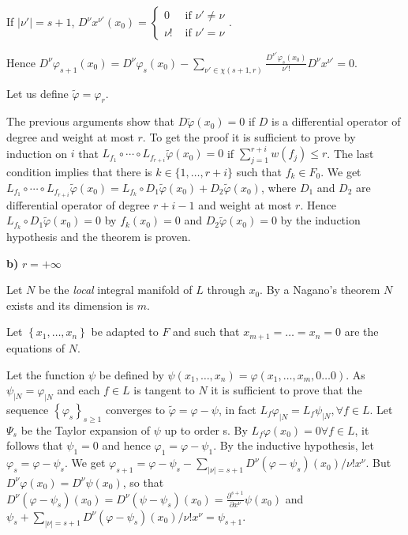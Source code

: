 \documentclass{article}
\begin{document}
If $\left|\nu'\right|=s+1$, $D^\nu x^{\nu'}\left(x_0\right)=\begin{cases}0 & \text { if } \nu' \neq \nu \\ \nu! & \text { if } \nu'=\nu\end{cases}$.

Hence $D^\nu \varphi_{s+1}\left(x_0\right)=D^\nu \varphi_s\left(x_0\right)-\sum_{\nu' \in \chi(s+1, r)} \frac{D^{\nu'} \varphi_s\left(x_0\right)}{\nu'!} D^\nu x^{\nu'}=0$.

Let us define $\tilde{\varphi}=\varphi_r$.

The previous arguments show that $D \tilde{\varphi}\left(x_0\right)=0$ if $D$ is a differential operator of degree and weight at most $r$. 
To get the proof it is sufficient to prove by induction on $i$ that $L_{f_1} \circ \cdots \circ L_{f_{r+i}} \tilde{\varphi}\left(x_0\right)=0$ if $\sum_{j=1}^{r+i} w\left(f_j\right) \leq r$. 
The last condition implies that there is $k \in \{ 1, \ldots, r+i \}$ such that $f_k \in F_0$. 
We get
$L_{f_1} \circ \cdots \circ L_{f_{r+i}} \tilde{\varphi}\left(x_0\right)=L_{f_k} \circ D_1 \tilde{\varphi}\left(x_0\right)+D_2 \tilde{\varphi}\left(x_0\right)$, where $D_1$ and $D_2$ are differential operator of degree $r+i-1$ and weight at most $r$. Hence $L_{f_k} \circ D_1 \tilde{\varphi}\left(x_0\right)=0$ by $f_k\left(x_0\right)=0$ and $D_2 \tilde{\varphi}\left(x_0\right)=0$ by the induction hypothesis and the theorem is proven.

\bigskip
\textbf{b)} \underline{$r=+\infty$}

Let $N$ be the \emph{local} integral manifold of $L$ through $x_0$. By a Nagano's theorem $N$ exists and its dimension is $m$.

Let $\left\{x_1, \ldots, x_n\right\}$ be adapted to $F$ and such that $x_{m+1}=\ldots=x_n=0$ are the equations of $N$.

Let the function $\psi$ be defined by $\psi\left(x_1, \ldots, x_n\right)=\varphi\left(x_1, \ldots, x_m, 0 \ldots 0\right)$.
As $\psi_{\mid N}=\varphi_{\mid N}$ and each $f \in L$ is tangent to $N$ it is sufficient to prove that the sequence $\left\{\varphi_s\right\}_{s \geq 1}$ converges to $\tilde{\varphi}=\varphi-\psi$, in fact $L_f \varphi_{\mid N}=L_f \psi_{\mid N}, \forall f \in L$. 
Let $\Psi_s$ be the Taylor expansion of $\psi$ up to order s. 
By $L_f \varphi\left(x_0\right)=0 \forall f \in L$,
it follows that $\psi_1=0$ and hence $\varphi_1=\varphi-\psi_1$. 
By the inductive hypothesis, let $\varphi_s=\varphi-\psi_s$. We get $\varphi_{s+1}=\varphi-\psi_s-\sum_{|\nu|=s+1} D^\nu\left(\varphi-\psi_s\right)\left(x_0\right) / \nu ! x^\nu$. 
But $D^\nu \varphi\left(x_0\right)=D^\nu \psi\left(x_0\right)$, so that $D^\nu\left(\varphi-\psi_s\right)\left(x_0\right)=D^\nu\left(\psi-\psi_s\right)\left(x_0\right)=\frac{\partial^{s+1}}{\partial x^\nu} \psi\left(x_0\right)$ and $\psi_s+\sum_{|\nu|=s+1} D^\nu\left(\varphi-\psi_s\right)\left(x_0\right) / \nu ! x^\nu=\psi_{s+1}$.
\end{document}
